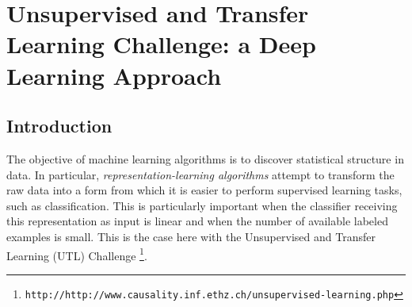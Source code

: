 \newcommand{\squeezeup}{\vspace{-2.5mm}}

\chapter{Unsupervised and Transfer Learning Challenge: a Deep Learning Approach}
\label{chap:utlc}

\section{Introduction}


The objective of machine learning algorithms is to discover statistical structure
in data. In particular, {\em representation-learning algorithms} attempt to
transform the raw data into a form from which it is easier to perform
supervised learning tasks, such as classification. This is particularly important
when the classifier receiving this representation as input is linear
and when the number of available labeled examples is small. This is the
case here with the Unsupervised and Transfer Learning (UTL) Challenge
\footnote{\tt http://http://www.causality.inf.ethz.ch/unsupervised-learning.php}.

